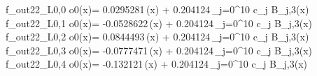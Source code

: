 f_{out22_L0,0	o0}(x)= 0.0295281\,\phi(x) + 0.204124\,\sum_{j=0}^{10} c_j B_{j,3}(x)
f_{out22_L0,1	o0}(x)= -0.0528622\,\phi(x) + 0.204124\,\sum_{j=0}^{10} c_j B_{j,3}(x)
f_{out22_L0,2	o0}(x)= 0.0844493\,\phi(x) + 0.204124\,\sum_{j=0}^{10} c_j B_{j,3}(x)
f_{out22_L0,3	o0}(x)= -0.0777471\,\phi(x) + 0.204124\,\sum_{j=0}^{10} c_j B_{j,3}(x)
f_{out22_L0,4	o0}(x)= -0.132121\,\phi(x) + 0.204124\,\sum_{j=0}^{10} c_j B_{j,3}(x)
